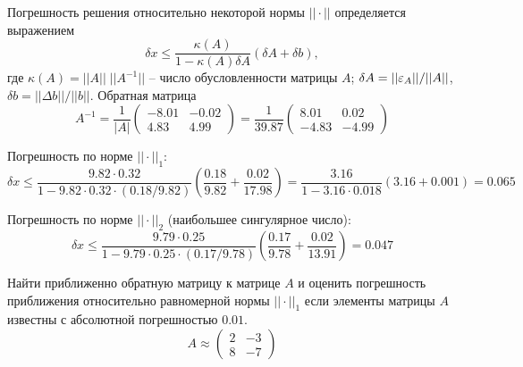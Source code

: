 Погрешность решения относительно некоторой нормы $||\cdot||$ определяется
выражением
\begin{equation*}
    \delta{x} \leq \frac{\kappa(A)}{1-\kappa(A)\delta{A}}(\delta{A}+\delta{b}),
\end{equation*}
где $\kappa(A) = ||A|| \; ||A^{-1}||$ -- число обусловленности матрицы $A$;
$\delta{A} = ||\varepsilon_A|| / ||A||$, $\delta{b} = ||\Delta{b}|| / ||b||$. Обратная
матрица
\begin{equation*}
    A^{-1} = \frac{1}{|A|}
    \begin{pmatrix}
        -8.01 & -0.02\\
        4.83 & 4.99
    \end{pmatrix}
    = \frac{1}{39.87}
    \begin{pmatrix}
        8.01 & 0.02\\
        -4.83 & -4.99
    \end{pmatrix}
\end{equation*}

Погрешность по норме $||\cdot||_1$:
\begin{equation*}
    \delta{x} \leq
    \frac{9.82\cdot{0.32}}{1-9.82\cdot{0.32}\cdot{(0.18/9.82)}}
    \left(\frac{0.18}{9.82} + \frac{0.02}{17.98}\right)
    =
    \frac{3.16}{1 - 3.16\cdot{0.018}} \left(3.16 + 0.001\right)
    =
    0.065
\end{equation*}

Погрешность по норме $||\cdot||_2$ (наибольшее сингулярное число):
\begin{equation*}
    \delta{x} \leq
    \frac{9.79\cdot{0.25}}{1-9.79\cdot{0.25}\cdot{(0.17/9.78)}}
    \left(\frac{0.17}{9.78} + \frac{0.02}{13.91}\right)
    =
    0.047
\end{equation*}


\vspace{1em}
\begin{problem}
    Найти приближенно обратную матрицу к матрице $A$ и оценить погрешность
    приближения относительно равномерной нормы $||\cdot||_1$ если элементы
    матрицы $A$ известны с абсолютной погрешностью $0.01$.
    \begin{equation*}
        A \approx \begin{pmatrix}
            2 & -3\\
            8 & -7
        \end{pmatrix}
    \end{equation*}
\end{problem}


